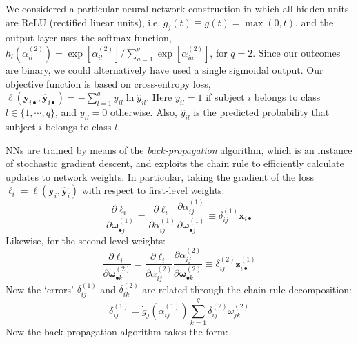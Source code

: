 \documentclass[a4paper]{article}
\begin{document}
We considered a particular neural network construction in which all hidden units are ReLU (rectified linear units), i.e. $g_{j}(t) \equiv g(t) = \max(0,t)$, and the output layer uses the softmax function, $h_{l}(\alpha_{il}^{(2)}) = \exp[\alpha_{il}^{(2)}]/\sum_{a=1}^{q}\exp[\alpha_{ia}^{(2)}]$, for $q=2$. Since our outcomes are binary, we could alternatively have used a single sigmoidal output. Our objective function is based on cross-entropy loss, $\ell(\bm{y}_{i\bullet},\bm{\hat{y}}_{i\bullet}) = -\sum_{l=1}^{q}y_{il}\ln\hat{y}_{il}$. Here $y_{il} = 1$ if subject $i$ belongs to class $l\in\{1,\cdots,q\}$, and $y_{il}=0$ otherwise. Also, $\hat{y}_{il}$ is the predicted probability that subject $i$ belongs to class $l$.

NNs are trained by means of the \textit{back-propagation} algorithm, which is an instance of stochastic gradient descent, and exploits the chain rule to efficiently calculate updates to network weights. In particular, taking the gradient of the loss $\ell_{i} = \ell(\bm{y}_{i},\bm{\hat{y}}_{i})$ with respect to first-level weights:
\begin{equation}
\frac{\partial\ell_{i}}{\partial\bm{\omega}_{\bullet j}^{(1)}} = \frac{\partial \ell_{i}}{\partial \alpha_{ij}^{(1)}}\frac{\partial \alpha_{ij}^{(1)}}{\partial\bm{\omega}_{\bullet j}^{(1)}} \equiv \delta_{ij}^{(1)}\bm{x}_{i\bullet}
\end{equation}
Likewise, for the second-level weights:
\begin{equation}
\frac{\partial \ell_{i}}{\partial \bm{\omega}_{\bullet k}^{(2)}} = \frac{\partial \ell_{i}}{\partial\alpha_{ij}^{(2)}}\frac{\partial \alpha_{ij}^{(2)}}{\partial\bm{\omega}_{\bullet k}^{(2)}} \equiv \delta_{ij}^{(2)}\bm{z}_{i\bullet}^{(1)}
\end{equation}
Now the `errors' $\delta_{ij}^{(1)}$ and $\delta_{ik}^{(2)}$ are related through the chain-rule decomposition:
\begin{equation}
\delta_{ij}^{(1)} = \dot{g}_{j}(\alpha_{ij}^{(1)})\sum_{k=1}^{q}\delta_{ij}^{(2)}\omega_{jk}^{(2)}
\end{equation}
Now the back-propagation algorithm takes the form:
\end{document}
